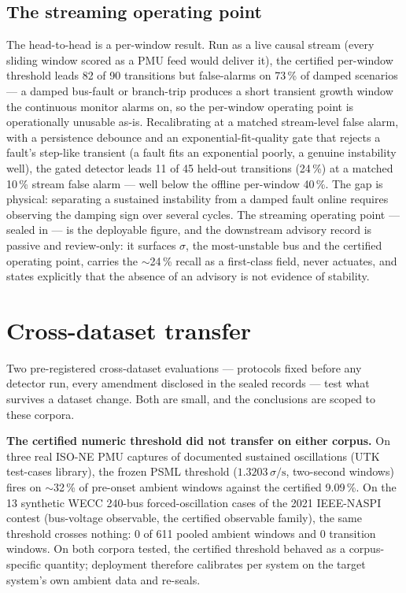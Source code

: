 \documentclass[aip,cha,preprint,amsmath,amssymb]{revtex4-2}
\begin{document}
\subsection{The streaming operating point}\label{sec:stream}

The head-to-head is a per-window result. Run as a live causal stream
(every sliding window scored as a PMU feed would deliver it), the
certified per-window threshold leads 82 of 90 transitions but
false-alarms on 73\,\% of damped scenarios --- a damped bus-fault or
branch-trip produces a short transient growth window the continuous
monitor alarms on, so the per-window operating point is operationally
unusable as-is. Recalibrating at a matched stream-level false alarm,
with a persistence debounce and an exponential-fit-quality gate that
rejects a fault's step-like transient (a fault fits an exponential
poorly, a genuine instability well), the gated detector leads 11 of 45
held-out transitions (24\,\%) at a matched 10\,\% stream false alarm
--- well below the offline per-window 40\,\%. The gap is physical:
separating a sustained instability from a damped fault online requires
observing the damping sign over several cycles. The streaming operating
point --- sealed in
--- is the deployable figure, and the downstream advisory record is
passive and review-only: it surfaces $\sigma$, the most-unstable bus
and the certified operating point, carries the $\sim$24\,\% recall as a
first-class field, never actuates, and states explicitly that the
absence of an advisory is not evidence of stability.

\section{Cross-dataset transfer}\label{sec:portability}

Two pre-registered cross-dataset evaluations --- protocols fixed before
any detector run, every amendment disclosed in the sealed records ---
test what survives a dataset change. Both are small, and the
conclusions are scoped to these corpora.

\textbf{The certified numeric threshold did not transfer on either
corpus.} On three real ISO-NE PMU captures of documented sustained
oscillations (UTK test-cases library), the frozen PSML threshold
($1.3203\,\sigma/\mathrm{s}$, two-second windows) fires on
$\sim$32\,\% of pre-onset ambient windows against the certified
9.09\,\%. On the 13 synthetic WECC 240-bus forced-oscillation cases of
the 2021 IEEE-NASPI contest (bus-voltage observable, the certified
observable family), the same threshold crosses nothing: 0 of 611 pooled
ambient windows and 0 transition windows. On both corpora tested, the
certified threshold behaved as a corpus-specific quantity; deployment
therefore calibrates per system on the target system's own ambient data
and re-seals.
\end{document}
